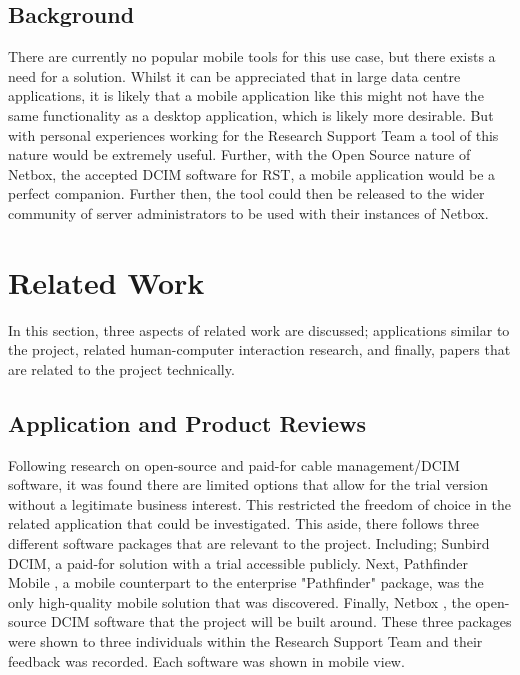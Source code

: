 \documentclass [11pt,a4paper]{article}
\begin{document}
\subsection{Background}
\label{sec:background}

There are currently no popular mobile tools for this use case, but there exists a need for a solution. Whilst it can be appreciated that in large data centre applications, it is likely that a mobile application like this might not have the same functionality as a desktop application, which is likely more desirable. But with personal experiences working for the Research Support Team a tool of this nature would be extremely useful. Further, with the Open Source nature of Netbox, the accepted DCIM software for RST, a mobile application would be a perfect companion. Further then, the tool could then be released to the wider community of server administrators to be used with their instances of Netbox.

\section{Related Work}

In this section, three aspects of related work are discussed; applications similar to the project, related human-computer interaction research, and finally, papers that are related to the project technically.

\subsection{Application and Product Reviews}
\label{sec:app_reviews}

Following research on open-source and paid-for cable management/DCIM software, it was found there are limited options that allow for the trial version without a legitimate business interest. This restricted the freedom of choice in the related application that could be investigated. This aside, there follows three different software packages that are relevant to the project. Including; Sunbird DCIM\cite{Sunbird}, a paid-for solution with a trial accessible publicly. Next, Pathfinder Mobile \cite{Pathfinder}, a mobile counterpart to the enterprise "Pathfinder" package, was the only high-quality mobile solution that was discovered. Finally, Netbox \cite{Netbox}, the open-source DCIM software that the project will be built around. These three packages were shown to three individuals within the Research Support Team and their feedback was recorded. Each software was shown in mobile view. 
\end{document}
